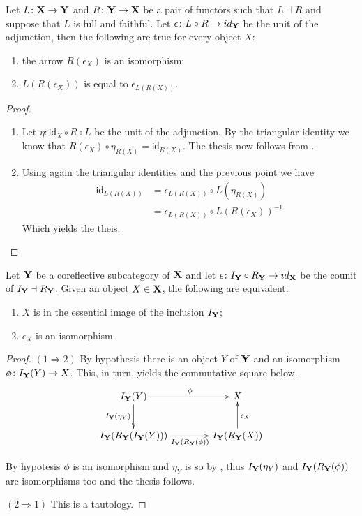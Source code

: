 \documentclass[a4paper,UKenglish,cleveref,pdftex,thm-restate,numberwithinsect]{lipics-v2021}
\newcommand{\id}[1]{\mathsf{id}_{#1}}
\def\X{\textbf {\textup{X}}}
\def\Y{\textbf {\textup{Y}}}
\begin{document}
\begin{corollary}\label{cor:cou}
Let $L\colon \X\to \Y$ and $R\colon \Y \to \X$ be a pair of functors such that $L\dashv R$ and suppose that $L$ is full and faithful. Let $\epsilon\colon L\circ R\to \id{\Y}$ be the unit of the adjunction, then the following are true for every object $X$:
\begin{enumerate}
	\item the arrow $R(\epsilon_X)$ is an isomorphism;
	\item $L(R(\epsilon_X))$ is equal to $\epsilon_{L(R(X))}$.
\end{enumerate}
\end{corollary}
\begin{proof}
	\begin{enumerate}
		\item Let $\eta\colon \id{X}\circ R\circ L$ be the unit of the adjunction. By the triangular identity we know that $R(\epsilon_X)\circ \eta_{R(X)}=\id{R(X)}$. The thesis now follows from .
		\item Using again the triangular identities and the previous point we have
		\begin{align*}
			\id{L(R(X))}&=\epsilon_{L(R(X))}\circ L(\eta_{R(X)})\\&= \epsilon_{L(R(X))}\circ L(R(\epsilon_X))^{-1}
		\end{align*}
		Which yields the theis. \qedhere 
	\end{enumerate}
\end{proof}

\begin{corollary}\label{cor:counit}
	Let $\Y$ be a coreflective subcategory of $\X$ and let $\epsilon \colon I_\Y\circ R_\Y \to  \id{\X}$ be the counit of $I_\Y\dashv R_\Y$. Given an object $X\in \X$, the following are equivalent:
	\begin{enumerate}
		\item $X$ is in the essential image of the inclusion $I_\Y$;
		\item $\epsilon_X$ is an isomorphism.
	\end{enumerate} 
\end{corollary}
\begin{proof}
	$(1\Rightarrow 2)$ By hypothesis there is an object $Y$ of $\Y$ and an isomorphism $\phi\colon I_\Y(Y)\to X$. This, in turn, yields the commutative square below.
	\[\xymatrix@C=40pt{I_\Y(Y) \ar[r]^-{\phi} \ar[d]_{I_\Y(\eta_Y)}&  X\\ I_\Y(R_\Y(I_\Y(Y)))  \ar[r]_-{I_\Y(R_\Y(\phi))}& I_\Y(R_\Y(X)) \ar[u]_{\epsilon_X}}\]
	
	By hypotesis $\phi$ is an isomorphism and $\eta_Y$ is so by , thus $I_\Y(\eta_Y)$ and 
	$I_\Y(R_\Y(\phi))$ are isomorphisms too and the thesis follows.
	
	\smallskip \noindent
	$(2\Rightarrow 1)$ This is a tautology.
\end{proof}
\end{document}
